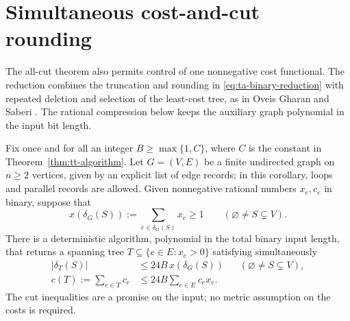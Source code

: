 \section{Simultaneous cost-and-cut rounding}
\label{sec:fractional-rounding}

The all-cut theorem also permits control of one nonnegative cost
functional. The reduction combines the truncation and rounding in
\eqref{eq:ta-binary-reduction} with repeated deletion and selection of
the least-cost tree, as in Oveis Gharan and Saberi
\cite[full preprint, Proposition~5.1]{OveisGharanSaberi2011}.
The rational compression below keeps the auxiliary graph polynomial
in the input bit length.

\begin{corollary}
\label{cor:ta-fractional-rounding}
Fix once and for all an integer $B\ge\max\{1,C\}$, where $C$ is the
constant in Theorem~\ref{thm:tt-algorithm}. Let $G=(V,E)$ be a finite undirected
graph on $n\ge2$ vertices, given by an explicit list of edge records;
in this corollary, loops and parallel records are allowed. Given
nonnegative rational numbers $x_e,c_e$ in binary, suppose that
\[
 x(\delta_G(S)):=\sum_{e\in\delta_G(S)}x_e\ge1
       \qquad(\varnothing\ne S\subsetneq V).
\]
There is a deterministic algorithm, polynomial in the total binary
input length, that returns a spanning tree
$T\subseteq\{e\in E:x_e>0\}$ satisfying simultaneously
\begin{align}
 |\delta_T(S)|&\le24B\,x(\delta_G(S))
       &&(\varnothing\ne S\subsetneq V),
       \label{eq:ta-fractional-cuts}\\
 c(T):=\sum_{e\in T}c_e&\le24B\sum_{e\in E}c_ex_e.
       \label{eq:ta-fractional-cost}
\end{align}
The cut inequalities are a promise on the input; no metric assumption
on the costs is required.
\end{corollary}


